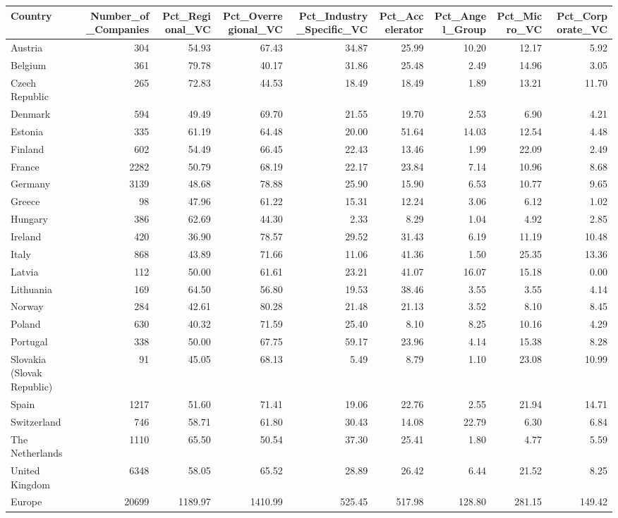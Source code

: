 \begin{tabular}{lrrrrrrrr}
  \toprule
Country & Number_of_Companies & Pct_Regional_VC & Pct_Overregional_VC & Pct_Industry_Specific_VC & Pct_Accelerator & Pct_Angel_Group & Pct_Micro_VC & Pct_Corporate_VC \\ 
  \midrule
Austria & 304 & 54.93 & 67.43 & 34.87 & 25.99 & 10.20 & 12.17 & 5.92 \\ 
  Belgium & 361 & 79.78 & 40.17 & 31.86 & 25.48 & 2.49 & 14.96 & 3.05 \\ 
  Czech Republic & 265 & 72.83 & 44.53 & 18.49 & 18.49 & 1.89 & 13.21 & 11.70 \\ 
  Denmark & 594 & 49.49 & 69.70 & 21.55 & 19.70 & 2.53 & 6.90 & 4.21 \\ 
  Estonia & 335 & 61.19 & 64.48 & 20.00 & 51.64 & 14.03 & 12.54 & 4.48 \\ 
  Finland & 602 & 54.49 & 66.45 & 22.43 & 13.46 & 1.99 & 22.09 & 2.49 \\ 
  France & 2282 & 50.79 & 68.19 & 22.17 & 23.84 & 7.14 & 10.96 & 8.68 \\ 
  Germany & 3139 & 48.68 & 78.88 & 25.90 & 15.90 & 6.53 & 10.77 & 9.65 \\ 
  Greece &  98 & 47.96 & 61.22 & 15.31 & 12.24 & 3.06 & 6.12 & 1.02 \\ 
  Hungary & 386 & 62.69 & 44.30 & 2.33 & 8.29 & 1.04 & 4.92 & 2.85 \\ 
  Ireland & 420 & 36.90 & 78.57 & 29.52 & 31.43 & 6.19 & 11.19 & 10.48 \\ 
  Italy & 868 & 43.89 & 71.66 & 11.06 & 41.36 & 1.50 & 25.35 & 13.36 \\ 
  Latvia & 112 & 50.00 & 61.61 & 23.21 & 41.07 & 16.07 & 15.18 & 0.00 \\ 
  Lithuania & 169 & 64.50 & 56.80 & 19.53 & 38.46 & 3.55 & 3.55 & 4.14 \\ 
  Norway & 284 & 42.61 & 80.28 & 21.48 & 21.13 & 3.52 & 8.10 & 8.45 \\ 
  Poland & 630 & 40.32 & 71.59 & 25.40 & 8.10 & 8.25 & 10.16 & 4.29 \\ 
  Portugal & 338 & 50.00 & 67.75 & 59.17 & 23.96 & 4.14 & 15.38 & 8.28 \\ 
  Slovakia (Slovak Republic) &  91 & 45.05 & 68.13 & 5.49 & 8.79 & 1.10 & 23.08 & 10.99 \\ 
  Spain & 1217 & 51.60 & 71.41 & 19.06 & 22.76 & 2.55 & 21.94 & 14.71 \\ 
  Switzerland & 746 & 58.71 & 61.80 & 30.43 & 14.08 & 22.79 & 6.30 & 6.84 \\ 
  The Netherlands & 1110 & 65.50 & 50.54 & 37.30 & 25.41 & 1.80 & 4.77 & 5.59 \\ 
  United Kingdom & 6348 & 58.05 & 65.52 & 28.89 & 26.42 & 6.44 & 21.52 & 8.25 \\ 
  Europe & 20699 & 1189.97 & 1410.99 & 525.45 & 517.98 & 128.80 & 281.15 & 149.42 \\ 
   \bottomrule
\end{tabular}
